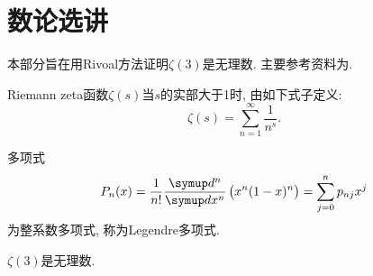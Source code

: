 \section{数论选讲}

本部分旨在用Rivoal方法证明$\zeta(3)$是无理数. 主要参考资料为\cite{zoudiji2019zeta1}.

\begin{definition}
    Riemann zeta函数$\zeta(s)$当$s$的实部大于1时, 由如下式子定义:
    \begin{equation}
        \zeta(s) = \sum_{n=1}^\infty \frac{1}{n^s}.
    \end{equation}
\end{definition}

\begin{definition}[Legendre多项式]
    多项式
    \begin{equation}
        P_n(x)=\frac{1}{n!}\frac{\diff^n}{\diff x^n}\lr(){x^n(1-x)^n} = \sum_{j=0}^n p_{nj}x^j
    \end{equation}
    为整系数多项式, 称为Legendre多项式.
\end{definition}

\begin{theorem}
    $\zeta(3)$是无理数.
\end{theorem}

